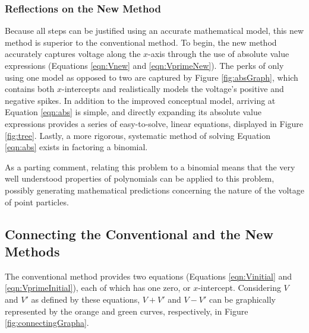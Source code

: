 \documentclass[titlepage]{article}
\begin{document}
\subsubsection*{Reflections on the New Method}
Because all steps can be justified using an accurate mathematical model, this new method is superior to the conventional method. To begin, the new method accurately captures voltage along the $x$-axis through the use of absolute value expressions (Equations \ref{eqn:Vnew} and \ref{eqn:VprimeNew}). The perks of only using one model as opposed to two are captured by Figure \ref{fig:absGraph}, which contains both $x$-intercepts and realistically models the voltage's positive and negative spikes. In addition to the improved conceptual model, arriving at Equation \ref{eqn:abs} is simple, and directly expanding its absolute value expressions provides a series of easy-to-solve, linear equations, displayed in Figure \ref{fig:tree}. Lastly, a more rigorous, systematic method of solving Equation \ref{eqn:abs} exists in factoring a binomial.\par
As a parting comment, relating this problem to a binomial means that the very well understood properties of polynomials can be applied to this problem, possibly generating mathematical predictions concerning the nature of the voltage of point particles.


\subsection*{Connecting the Conventional and the New Methods}
The conventional method provides two equations (Equations \ref{eqn:Vinitial} and \ref{eqn:VprimeInitial}), each of which has one zero, or $x$-intercept. Considering $V$ and $V'$ as defined by these equations, $V+V'$ and $V-V'$ can be graphically represented by the orange and green curves, respectively, in Figure \ref{fig:connectingGrapha}.
\end{document}
